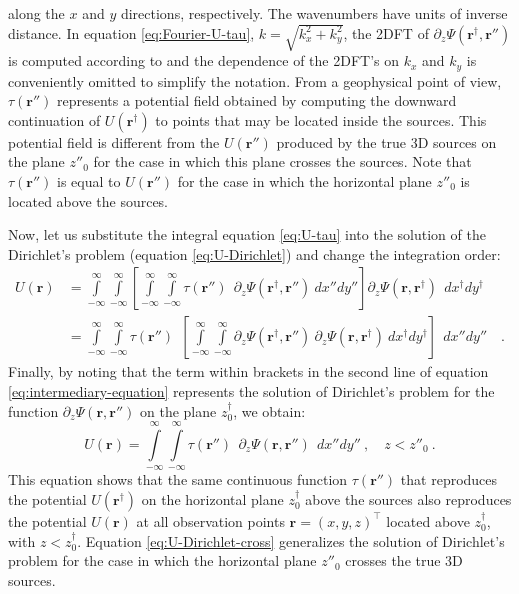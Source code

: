 along the $x$ and $y$ directions, respectively.
The wavenumbers have units of inverse distance. In equation \ref{eq:Fourier-U-tau},
$k = \sqrt{k_{x}^{2} + k_{y}^{2}}$, the 2DFT of 
$\partial_{z} \Psi(\mathbf{r}^{\dagger}, \mathbf{r}'')$ is computed according to
\citet[][ p. 275]{blakely1996} and the dependence of the 2DFT's on $k_{x}$ and $k_{y}$
is conveniently omitted to simplify the notation.
From a geophysical point of view, $\tau(\mathbf{r}'')$ represents a  
potential field obtained by computing the downward continuation of 
$U(\mathbf{r}^{\dagger})$ to points that may be located inside the sources. 
This potential field is different from the $U(\mathbf{r}'')$ produced by the true 3D 
sources on the plane $z''_{0}$ for the case in which this plane crosses the sources.
Note that $\tau(\mathbf{r}'')$ is equal to $U(\mathbf{r}'')$ for the case in which the
horizontal plane $z''_{0}$ is located above the sources.

Now, let us substitute the integral equation \ref{eq:U-tau} into the solution of the
Dirichlet's problem (equation \ref{eq:U-Dirichlet}) and change the integration order:
\begin{equation}
	\begin{split}
		U(\mathbf{r}) 
		&= \int\limits_{-\infty}^{\infty} \int\limits_{-\infty}^{\infty}
		\left[ 
		\int\limits_{-\infty}^{\infty} \int\limits_{-\infty}^{\infty}
		\tau(\mathbf{r}'') \:\: 
		\partial_{z} \Psi(\mathbf{r}^{\dagger}, \mathbf{r}'') 
		\: dx''dy'' \right]
		\partial_{z} \Psi(\mathbf{r}, \mathbf{r}^{\dagger}) 
		\:\: dx^{\dagger}dy^{\dagger} \\
		&= 
		\int\limits_{-\infty}^{\infty} \int\limits_{-\infty}^{\infty}
		\tau(\mathbf{r}'') \:\:
		\left[ 
		\int\limits_{-\infty}^{\infty} \int\limits_{-\infty}^{\infty}
		\partial_{z} \Psi(\mathbf{r}^{\dagger}, \mathbf{r}'')
		\: \partial_{z} \Psi(\mathbf{r}, \mathbf{r}^{\dagger}) 
		\: dx^{\dagger}dy^{\dagger} \right]
		\:\: dx''dy'' \quad .
	\end{split}
	\label{eq:intermediary-equation}
\end{equation}
Finally, by noting that the term within brackets in the second line of equation
\ref{eq:intermediary-equation} represents the solution of Dirichlet's problem
for the function $\partial_{z} \Psi(\mathbf{r}, \mathbf{r}'')$ on the plane
$z^{\dagger}_{0}$, we obtain:
\begin{equation}
	U(\mathbf{r}) =  
	\int\limits_{-\infty}^{\infty} \int\limits_{-\infty}^{\infty}
	\tau(\mathbf{r}'') \:\: 
	\partial_{z} \Psi(\mathbf{r}, \mathbf{r}'') 
	\:\: dx''dy'' \: , \quad z < z''_{0} \: .
	\label{eq:U-Dirichlet-cross}
\end{equation}
This equation shows that the same continuous function $\tau(\mathbf{r}'')$
that reproduces the potential $U(\mathbf{r}^{\dagger})$ on the horizontal plane 
$z^{\dagger}_{0}$ above the sources also reproduces the potential $U(\mathbf{r})$ 
at all observation points 
$\mathbf{r} = (x, y, z)^{\top}$ located above $z^{\dagger}_{0}$, with $z < z^{\dagger}_{0}$.
Equation \ref{eq:U-Dirichlet-cross} generalizes the solution of Dirichlet's problem
for the case in which the horizontal plane $z''_{0}$ crosses the true 3D sources.

